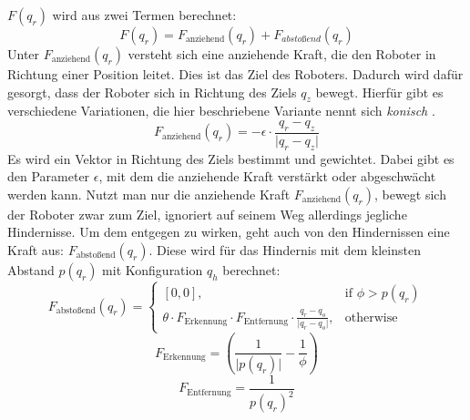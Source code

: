 $F(q_r)$ wird aus zwei Termen berechnet:
\begin{equation}
	F(q_r) = F_{\text{anziehend}}(q_r) + F_{abstoßend}(q_r)
\end{equation}
Unter $F_{\text{anziehend}}(q_r)$ versteht sich eine anziehende Kraft, die den Roboter in  Richtung einer Position leitet.
Dies ist das Ziel des Roboters.
Dadurch wird dafür gesorgt, dass der Roboter sich in Richtung des Ziels $q_z$ bewegt.
Hierfür gibt es verschiedene Variationen, die hier beschriebene Variante nennt sich \textit{konisch} \cite{Formulars}.
\begin{equation}
	F_{\text{anziehend}}(q_r) = - \epsilon \cdot \frac{q_r - q_z}{\lvert q_r - q_z \rvert}
\end{equation}
Es wird ein Vektor in Richtung des Ziels bestimmt und gewichtet. Dabei gibt es den Parameter $\epsilon$, mit dem die anziehende Kraft verstärkt oder abgeschwächt werden kann.
\newline
Nutzt man nur die anziehende Kraft $F_{\text{anziehend}}(q_r)$, bewegt sich der Roboter zwar zum Ziel, ignoriert auf seinem Weg allerdings jegliche Hindernisse.
Um dem entgegen zu wirken, geht auch von den Hindernissen eine Kraft aus: $F_{\text {abstoßend}}(q_r)$.
Diese wird für das Hindernis mit dem kleinsten Abstand $p(q_r)$ mit Konfiguration $q_h$  berechnet:
\begin{equation}
	F_{\text{abstoßend}}(q_r) =
	\begin{cases}
    [0,0] ,& \text{if } \phi > p(q_r)\\
     \theta \cdot F_{\text{Erkennung}} \cdot F_{\text{Entfernung}} \cdot \frac{q_r - q_o}{ \lvert q_r - q_o \rvert },               & \text{otherwise}
\end{cases}
\end{equation}
\begin{equation}
 F_{\text{Erkennung}} = \left( \frac{1}{\lvert p(q_r) \rvert} - \frac{1}{\phi} \right)
\end{equation}
\begin{equation}
F_{\text{Entfernung}} = \frac{1}{p(q_r)^2}
\end{equation}

